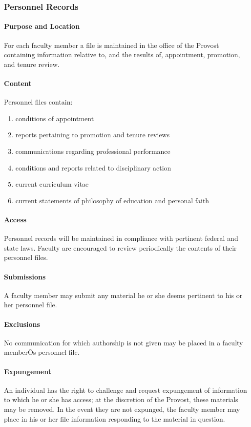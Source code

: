 \documentclass[letterpaper, 11pt]{article}
\begin{document}
		\subsubsection{Personnel Records}
			\paragraph{Purpose and Location}
				For each faculty member a file is maintained in the office of the Provost containing information relative to, and the results of, appointment, promotion, and tenure review.
			\paragraph{Content}
				Personnel files contain:
				\begin{enumerate}[label=\alph*)]
					\item{conditions of appointment}
					\item{reports pertaining to promotion and tenure reviews}
					\item{communications regarding professional performance}
					\item{conditions and reports related to disciplinary action}
					\item{current curriculum vitae}
					\item{current statements of philosophy of education and personal faith}
				\end{enumerate}
			\paragraph{Access}
				Personnel records will be maintained in compliance with pertinent federal and state laws.  Faculty are encouraged to review periodically the contents of their personnel files.
			\paragraph{Submissions}
				A faculty member may submit any material he or she deems pertinent to his or her personnel file.
			\paragraph{Exclusions}
				No communication for which authorship is not given may be placed in a faculty memberÕs personnel file.
			\paragraph{Expungement}
				An individual has the right to challenge and request expungement of information to which he or she has access; at the discretion of the Provost, these materials may be removed.  In the event they are not expunged, the faculty member may place in his or her file information responding to the material in question.
\end{document}
